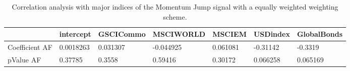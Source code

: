 \begin{table}[H]
\centering
\begin{tabular}{lllllll}
& intercept & GSCICommo & MSCIWORLD & MSCIEM & USDindex & GlobalBonds \\ 
\hline 
Coefficient AF & 0.0018263 & 0.031307 & -0.044925 & 0.061081 & -0.31142 & -0.3319 \\ 
pValue AF & 0.37785 & 0.3558 & 0.59416 & 0.30172 & 0.066258 & 0.065169 \\ 
\hline
\end{tabular}
\caption{Correlation analysis with major indices of the Momentum Jump signal with a equally weighted weighting scheme.}
\label{MOMJUMPEW_AFACTOR}
\end{table}